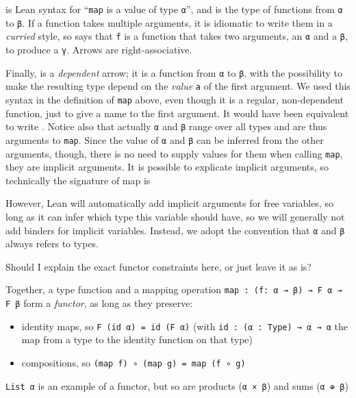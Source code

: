 \documentclass[titlepage]{report}
\newenvironment{remark}[1][Remark:]{\begin{trivlist}                         
    \item[\hskip \labelsep {\bfseries #1}]}{\end{trivlist}}
\newenvironment{todo}[1][Todo:]{\begin{trivlist}                         
    \item[\hskip \labelsep {\bfseries #1}]}{\end{trivlist}}
\begin{document}
\begin{remark}
     is Lean syntax for ``\texttt{map} is a value of type \texttt{α}'', and  is the type of functions from \texttt{α} to \texttt{β}. 
    If a function takes multiple arguments, it is idiomatic to write them in a \emph{curried} style,
    so  says that \texttt{f} is a function that takes two arguments, an \texttt{α} and a \texttt{β}, to produce a \texttt{γ}. Arrows are right-associative.

    Finally,  is a \emph{dependent} arrow; it is a function from \texttt{α} to \texttt{β}, with the possibility to make the resulting type depend on the \emph{value} \texttt{a} of the first argument. 
    We used this syntax in the definition of \texttt{map} above, even though it is a regular, non-dependent function, just to give a name to the first argument. 
    It would have been equivalent to write .
    Notice also that actually \texttt{α} and \texttt{β} range over all types and are thus arguments to \texttt{map}. Since the value of \texttt{α} and \texttt{β} can be inferred from the other arguments, though, there is no need to supply values for them when calling \texttt{map}, they are implicit arguments. It is possible to explicate implicit arguments, so technically the signature of map is 
    \begin{center}
    \end{center}
    However, Lean will automatically add implicit arguments for free variables, so long as it can infer which type this variable should have, so we will generally not add binders for implicit variables. Instead, we adopt the convention that \texttt{α} and \texttt{β} always refers to types. 
\end{remark}

\begin{todo}
    Should I explain the exact functor constraints here, or just leave it as is?
\end{todo}

Together, a type function  and a mapping operation \texttt{map : (f: α → β) → F α → F β} form a \emph{functor}, as long as they preserve: 
\begin{itemize}
    \item identity maps, so \texttt{F (id α) = id (F α)} (with \texttt{id : (α : Type) → α → α} the map from a type to the identity function on that type)
    \item compositions, so \texttt{(map f) ∘ (map g) = map (f ∘ g)}
\end{itemize}
\texttt{List α} is an example of a functor, but so are products (\texttt{α × β}) and sums 
(\texttt{α ⊕ β})
\end{document}

